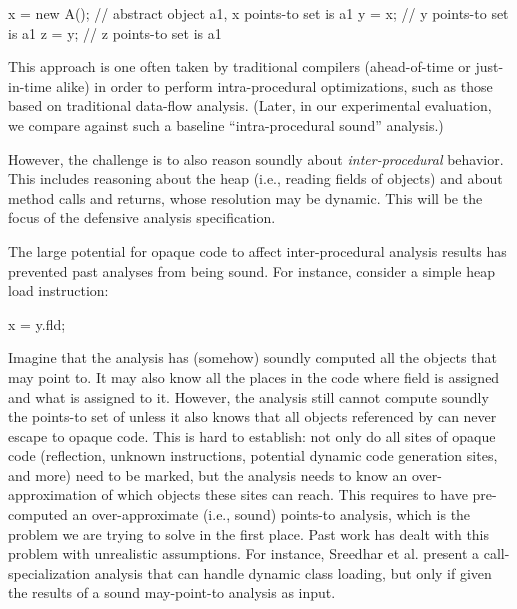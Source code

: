 \vspace{-3mm}\begin{minipage}[l]{5.1in}
\begin{javacodeNoLines}
x = new A();  // abstract object a1, x points-to set is {a1}
y = x;  // y points-to set is {a1}
z = y;  // z points-to set is {a1}
\end{javacodeNoLines}
\end{minipage}

This approach is one often taken by traditional compilers
(ahead-of-time or just-in-time alike) in order to perform
intra-procedural optimizations, such as those based on traditional
data-flow analysis. (Later, in our experimental evaluation, we compare
against such a baseline ``intra-procedural sound'' analysis.)

However, the challenge is to also reason soundly about
\emph{inter-procedural} behavior. This includes reasoning about the
heap (i.e., reading fields of objects) and about method calls and
returns, whose resolution may be dynamic. This will be the focus of
the defensive analysis specification.

The large potential for opaque code to affect inter-procedural
analysis results has prevented past analyses from being sound. For
instance, consider a simple heap load instruction:

\vspace{-3mm}\begin{minipage}[l]{5.1in}
\begin{javacodeNoLines}
x = y.fld;
\end{javacodeNoLines}
\end{minipage}

\noindent Imagine that the analysis has (somehow) soundly computed all
the objects that  may point to. It may also know all the places
in the code where field  is assigned and what is
assigned to it. However, the analysis still cannot compute soundly the
points-to set of  unless it also knows that all objects
referenced by  can never escape to opaque code. This is
hard to establish: not only do all sites of opaque code
(reflection, unknown instructions, potential dynamic code generation
sites, and more) need to be marked, but the analysis needs to know an
over-approximation of which objects these sites can reach. This
requires to have pre-computed an over-approximate (i.e., sound)
points-to analysis, which is the problem we are trying to solve in the
first place. Past work has dealt with this problem with unrealistic
assumptions. For instance,
Sreedhar et al. \cite{Sreedhar:2000:FIO:349299.349326} present a
call-specialization analysis that can handle dynamic class loading,
but only if given the results of a sound may-point-to analysis as
input.

